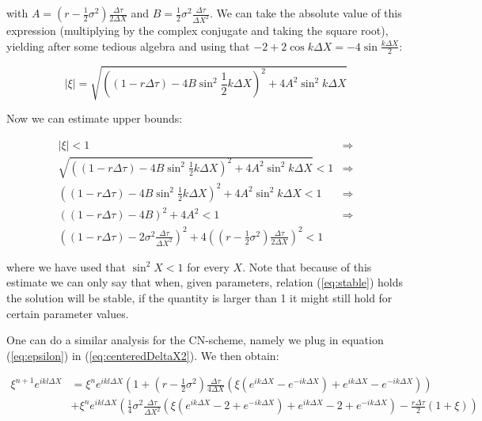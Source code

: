 \documentclass[11pt,a4paper]{article}
\begin{document}
with $A = \left(r-\frac{1}{2}\sigma^2\right)\frac{\Delta \tau}{2\Delta X}$ and $B = \frac{1}{2}\sigma^2\frac{\Delta \tau}{\Delta X^2}$. We can take the absolute value of this expression (multiplying by the complex conjugate and taking the square root), yielding after some tedious algebra and using that $-2 + 2\cos{k\Delta X} = -4\sin{\frac{k\Delta X}{2}}$:

\begin{equation*}
  |\xi| = \sqrt{\left((1 - r\Delta \tau) - 4B \sin^2{\frac{1}{2}k\Delta X}\right)^2 + 4A^2\sin^2{k\Delta X}}
\end{equation*}

Now we can estimate upper bounds:

\begin{align}
  |\xi| < 1 &\Rightarrow \nonumber \\
  \sqrt{\left((1 - r\Delta \tau) - 4B \sin^2{\frac{1}{2}k\Delta X}\right)^2 + 4A^2\sin^2{k\Delta X}} < 1 &\Rightarrow \nonumber \\
  \left((1 - r\Delta \tau) - 4B \sin^2{\frac{1}{2}k\Delta X}\right)^2 + 4A^2\sin^2{k\Delta X} < 1 &\Rightarrow \nonumber \\
  \left((1 - r\Delta \tau) - 4B\right)^2 + 4A^2 < 1 &\Rightarrow \nonumber \\
  \left((1 - r\Delta \tau) - 2\sigma^2\frac{\Delta \tau}{\Delta X^2}\right)^2 + 4\left(\left(r-\frac{1}{2}\sigma^2\right)\frac{\Delta \tau}{2\Delta X}\right)^2 < 1
  \label{eq:stable}
\end{align}

where we have used that $\sin^2{X} < 1$ for every $X$. Note that because of this estimate we can only say that when, given parameters, relation (\ref{eq:stable}) holds the solution will be stable, if the quantity is larger than 1 it might still hold for certain parameter values.

One can do a similar analysis for the CN-scheme, namely we plug in equation (\ref{eq:epsilon}) in (\ref{eq:centeredDeltaX2}). We then obtain:

\begin{align*}
    \xi^{n+1}e^{ikl\Delta X} &= \xi^ne^{ikl\Delta X}\left(1 + \left(r-\frac{1}{2}\sigma^2\right)\frac{\Delta \tau}{4\Delta X}\left(\xi \left(e^{ik\Delta X} - e^{-ik\Delta X}\right) + e^{ik\Delta X} - e^{-ik\Delta X}\right)\right)  \\
&+ \xi^ne^{ikl\Delta X}\left(\frac{1}{4}\sigma^2\frac{\Delta \tau}{\Delta X^2}\left(\xi \left(e^{ik\Delta X} -2 + e^{-ik\Delta X}\right) + e^{ik\Delta X} -2 + e^{-ik\Delta X}\right) - \frac{r\Delta \tau}{2}\left(1 + \xi\right) \right)
\end{align*}
\end{document}
